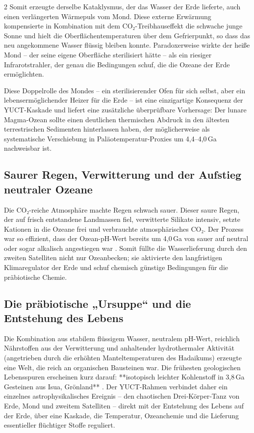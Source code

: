 \documentclass[11pt,a4paper]{article}
\begin{document}
\begin{multicols}{2}
		Somit erzeugte derselbe Kataklysmus, der das Wasser der Erde lieferte, auch einen verlängerten Wärmepuls vom Mond. Diese externe Erwärmung kompensierte in Kombination mit dem CO₂-Treibhauseffekt die schwache junge Sonne und hielt die Oberflächentemperaturen über dem Gefrierpunkt, so dass das neu angekommene Wasser flüssig bleiben konnte. Paradoxerweise wirkte der heiße Mond – der seine eigene Oberfläche sterilisiert hätte – als ein riesiger Infrarotstrahler, der genau die Bedingungen schuf, die die Ozeane der Erde ermöglichten.
		
		Diese Doppelrolle des Mondes – ein sterilisierender Ofen für sich selbst, aber ein lebensermöglichender Heizer für die Erde – ist eine einzigartige Konsequenz der YUCT-Kaskade und liefert eine zusätzliche überprüfbare Vorhersage: Der lunare Magma-Ozean sollte einen deutlichen thermischen Abdruck in den ältesten terrestrischen Sedimenten hinterlassen haben, der möglicherweise als systematische Verschiebung in Paläotemperatur-Proxies um 4,4–4,0 Ga nachweisbar ist.
		
		\subsection{Saurer Regen, Verwitterung und der Aufstieg neutraler Ozeane}
		
		Die CO₂-reiche Atmosphäre machte Regen schwach sauer. Dieser saure Regen, der auf frisch entstandene Landmassen fiel, verwitterte Silikate intensiv, setzte Kationen in die Ozeane frei und verbrauchte atmosphärisches CO₂. Der Prozess war so effizient, dass der Ozean-pH-Wert bereits um 4,0 Ga von sauer auf neutral oder sogar alkalisch angestiegen war \cite{KrissansenTotton2019}. Somit füllte die Wasserlieferung durch den zweiten Satelliten nicht nur Ozeanbecken; sie aktivierte den langfristigen Klimaregulator der Erde und schuf chemisch günstige Bedingungen für die präbiotische Chemie.
		
		\subsection{Die präbiotische „Ursuppe“ und die Entstehung des Lebens}
		
		Die Kombination aus stabilem flüssigem Wasser, neutralem pH-Wert, reichlich Nährstoffen aus der Verwitterung und anhaltender hydrothermaler Aktivität (angetrieben durch die erhöhten Manteltemperaturen des Hadaikums) erzeugte eine Welt, die reich an organischen Bausteinen war. Die frühesten geologischen Lebensspuren erscheinen kurz darauf: **isotopisch leichter Kohlenstoff in 3,8 Ga Gesteinen aus Isua, Grönland** \cite{Arndt2012}. Der YUCT-Rahmen verbindet daher ein einzelnes astrophysikalisches Ereignis – den chaotischen Drei‑Körper‑Tanz von Erde, Mond und zweitem Satelliten – direkt mit der Entstehung des Lebens auf der Erde, über eine Kaskade, die Temperatur, Ozeanchemie und die Lieferung essentieller flüchtiger Stoffe reguliert.
		

\end{multicols}
\end{document}
